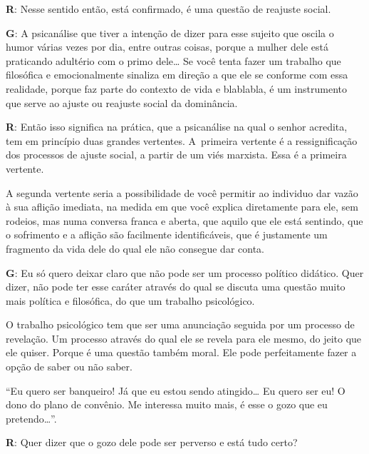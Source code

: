  

\textbf{R}: Nesse sentido então, está confirmado, é uma questão de
reajuste social.

 

\textbf{G}: A psicanálise que tiver a intenção de dizer para esse
sujeito que oscila o humor várias vezes por dia, entre outras coisas,
porque a mulher dele está praticando adultério com o primo dele…
Se você tenta fazer um trabalho que filosófica e emocionalmente sinaliza
em direção a que ele se conforme com essa realidade, porque faz parte do
contexto de vida e blablabla, é um instrumento que serve ao ajuste ou
reajuste social da dominância.

 

\textbf{R}: Então isso significa na prática, que a psicanálise na qual o
senhor acredita, tem em princípio duas grandes vertentes. A~primeira
vertente é a ressignificação dos processos de ajuste social, a partir de
um viés marxista. Essa é a primeira vertente.

 

A segunda vertente seria a possibilidade de você permitir ao individuo
dar vazão à sua aflição imediata, na medida em que você explica
diretamente para ele, sem rodeios, mas numa conversa franca e aberta,
que aquilo que ele está sentindo, que o sofrimento e a aflição são
facilmente identificáveis, que é justamente um fragmento da vida dele do
qual ele não consegue dar conta.

 

\textbf{G}: Eu só quero deixar claro que não pode ser um processo
político didático. Quer dizer, não pode ter esse caráter através do qual
se discuta uma questão muito mais política e filosófica, do que um
trabalho psicológico.

 

O trabalho psicológico tem que ser uma anunciação seguida por um
processo de revelação. Um processo através do qual ele se revela para
ele mesmo, do jeito que ele quiser. Porque é uma questão também moral.
Ele pode perfeitamente fazer a opção de saber ou não saber.

 

``Eu quero ser banqueiro! Já que eu estou sendo atingido… Eu
quero ser eu! O dono do plano de convênio. Me interessa muito mais, é
esse o gozo que eu pretendo…''.

 

\textbf{R}: Quer dizer que o gozo dele pode ser perverso e está tudo
certo?

 

